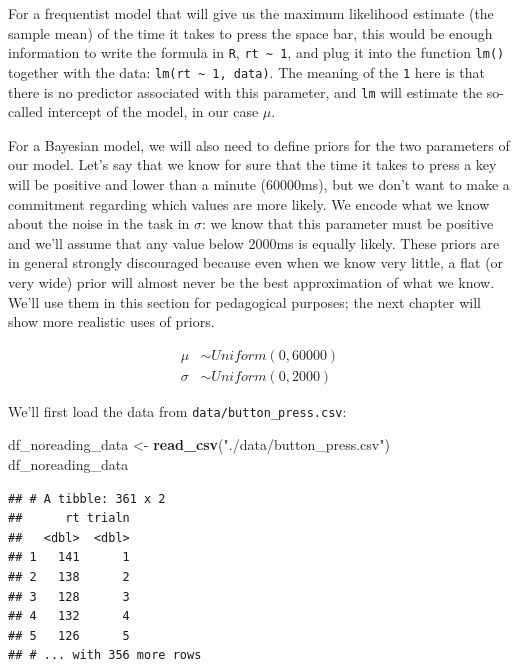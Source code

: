 \documentclass[12pt,]{krantz}
\newenvironment{Shaded}{\begin{snugshade}}{\end{snugshade}}
\newcommand{\KeywordTok}[1]{\textcolor[rgb]{0.13,0.29,0.53}{\textbf{#1}}}
\newcommand{\StringTok}[1]{\textcolor[rgb]{0.31,0.60,0.02}{#1}}
\newcommand{\NormalTok}[1]{#1}
\theoremstyle{definition}
\theoremstyle{definition}
\theoremstyle{definition}
\theoremstyle{remark}
\begin{document}
For a frequentist model that will give us the maximum likelihood
estimate (the sample mean) of the time it takes to press the space bar,
this would be enough information to write the formula in \texttt{R},
\texttt{rt\ \textasciitilde{}\ 1}, and plug it into the function
\texttt{lm()} together with the data:
\texttt{lm(rt\ \textasciitilde{}\ 1,\ data)}. The meaning of the
\texttt{1} here is that there is no predictor associated with this
parameter, and \texttt{lm} will estimate the so-called intercept of the
model, in our case \(\mu\).

For a Bayesian model, we will also need to define priors for the two
parameters of our model. Let's say that we know for sure that the time
it takes to press a key will be positive and lower than a minute
(60000ms), but we don't want to make a commitment regarding which values
are more likely. We encode what we know about the noise in the task in
\(\sigma\): we know that this parameter must be positive and we'll
assume that any value below 2000ms is equally likely. These priors are
in general strongly discouraged because even when we know very little, a
flat (or very wide) prior will almost never be the best approximation of
what we know. We'll use them in this section for pedagogical purposes;
the next chapter will show more realistic uses of priors.

\begin{equation}
\begin{aligned}
\mu &\sim Uniform(0, 60000) \\
\sigma &\sim Uniform(0, 2000) 
\end{aligned}
\label{eq:rtpriors}
\end{equation}

We'll first load the data from \texttt{data/button\_press.csv}:

\begin{Shaded}
\begin{Highlighting}[]
\NormalTok{df_noreading_data <-}\StringTok{ }\KeywordTok{read_csv}\NormalTok{(}\StringTok{"./data/button_press.csv"}\NormalTok{)}
\NormalTok{df_noreading_data}
\end{Highlighting}
\end{Shaded}

\begin{verbatim}
## # A tibble: 361 x 2
##      rt trialn
##   <dbl>  <dbl>
## 1   141      1
## 2   138      2
## 3   128      3
## 4   132      4
## 5   126      5
## # ... with 356 more rows
\end{verbatim}
\end{document}
